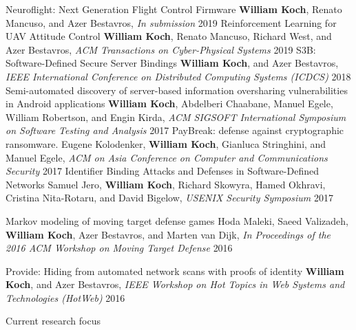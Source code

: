 

\begin{cvhonors}

  \cvhonor
    {{\starpub} Neuroflight: Next Generation Flight Control Firmware} %
    {\textbf{William Koch}, Renato Mancuso, and Azer Bestavros, \textit{In submission}} %
    {} %
    {2019} %
  \cvhonor
    {{\starpub} Reinforcement Learning for UAV Attitude Control} %
    {\textbf{William Koch}, Renato Mancuso, Richard West, and Azer Bestavros, \textit{ACM Transactions on Cyber-Physical Systems}} %
    {} %
    {2019} %
  \cvhonor
    {S3B: Software-Defined Secure Server Bindings} %
    {\textbf{William Koch}, and Azer Bestavros, \textit{IEEE International Conference on Distributed Computing Systems (ICDCS)}} %
    {} %
    {2018} %
  \cvhonor
    {Semi-automated discovery of server-based information oversharing vulnerabilities in Android applications} %
    {\textbf{William Koch}, Abdelberi Chaabane, Manuel Egele, William Robertson, and Engin Kirda, \textit{ACM SIGSOFT International Symposium on Software Testing and Analysis}} %
    {} %
    {2017} %
  \cvhonor
    {PayBreak: defense against cryptographic ransomware.} %
    {Eugene Kolodenker, \textbf{William Koch}, Gianluca Stringhini, and Manuel Egele, \textit{ACM on Asia Conference on Computer and Communications Security}} %
    {} %
    {2017} %
  \cvhonor
    {Identifier Binding Attacks and Defenses in Software-Defined Networks} %
    {Samuel Jero, \textbf{William Koch}, Richard Skowyra, Hamed Okhravi, Cristina Nita-Rotaru, and David Bigelow, \textit{USENIX Security Symposium}} %
    {} %
    {2017} %

  \cvhonor
    {Markov modeling of moving target defense games} %
    {Hoda Maleki,  Saeed Valizadeh, \textbf{William Koch}, Azer Bestavros, and Marten
        van Dijk, \textit{In Proceedings of the 2016 ACM Workshop on Moving Target Defense}} %
    {} %
    {2016} %

  \cvhonor
    {Provide: Hiding from automated network scans with proofs of identity} %
    {\textbf{William Koch}, and Azer Bestavros, \textit{IEEE Workshop on Hot Topics in Web Systems and Technologies (HotWeb)}} %
    {} %
    {2016} %
    
\end{cvhonors}

{\hspace*{0pt}\hfill\scriptsize {\starpub} Current research focus}
